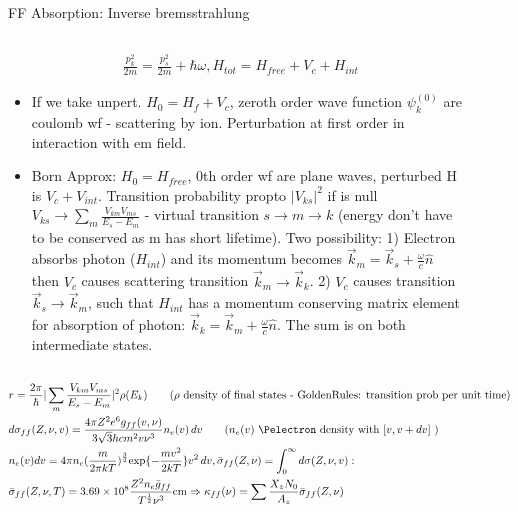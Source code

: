 \begin{frame}{FF Absorption: Inverse bremsstrahlung}
    \begin{columns}[T]
        \begin{column}{0.65\textwidth}
    \begin{align*}
        &\frac{p_k^2}{2m}=\frac{p_s^2}{2m}+\hbar\omega, H_{tot}=H_{free}+V_c+H_{int}\tag{Heavy Z absorbs negl. kin ener.}
    \end{align*}
    \begin{itemize}
        \item If we take unpert. $H_0=H_f+V_c$, zeroth order wave function $\psi_k^{(0)}$ are coulomb wf - \Pelectron scattering by ion. Perturbation at first order in interaction with em field.
    \item Born Approx: $H_0=H_{free}$, 0th order wf are plane waves, perturbed H is $V_c+V_{int}$. Transition probability propto $|V_{ks}|^2$ if is null $V_{ks}\to\sum_m \frac{V_{km}V_{ms}}{E_s-E_m}$ - virtual transition $s\to m \to k$ (energy don't have to be conserved as m has short lifetime). Two possibility: 1) Electron absorbs photon ($H_{int}$) and its momentum becomes $\vec{k}_m=\vec{k}_s+\frac{\omega}{c}\hat{n}$ then $V_c$ causes scattering transition $\vec{k}_m\to\vec{k}_k$. 2) $V_c$ causes transition $\vec{k}_s\to\vec{k}_m$, such that $H_{int}$ has a momentum conserving matrix element for absorption of photon: $\vec{k}_k=\vec{k}_m+\frac{\omega}{c}\hat{n}$. The sum is on both intermediate states.
        \end{itemize}
        \end{column}
        \begin{column}{0.35\textwidth}
            \begin{figure}[!ht]
                \texttt{[image: FF-feynman]}\label{fig:FF-feynman}
			\end{figure}
        \end{column}
    \end{columns}
    \begin{align*}
        &r=\frac{2\pi}{\hbar}|\sum_m \frac{V_{km}V_{ms}}{E_s-E_m}|^2\rho(E_k)\tag{$\rho$ density of final states - GoldenRules: transition prob per unit time}\\
        &d\sigma_{ff}(Z,\nu,v)=\frac{4\pi Z^2e^6g_{ff}(v,\nu)}{3\sqrt{3}hcm^2v\nu^3}n_e(v)\,dv\tag{$n_e(v)$ \Pelectron density with $[v,v+dv]$ }\\
        &n_e(v)dv=4\pi n_e(\frac{m}{2\pi kT})^{\frac{3}{2}}\Exp{-\frac{mv^2}{2kT}}v^2\,dv, \bar{\sigma}_{ff}(Z,\nu)=\int_0^{\infty}d\sigma(Z,\nu,v):\\
        &\bar{\sigma}_{ff}(Z,\nu,T)=\num{3.69e8}\frac{Z^2n_e\bar{g}_{ff}}{T^{\frac{1}{2}}\nu^3}\si{\cm}\Rightarrow\kappa_{ff}(\nu)=\sum \frac{X_zN_0}{A_z}\bar{\sigma}_{ff}(Z,\nu)
    \end{align*}
\end{frame}

